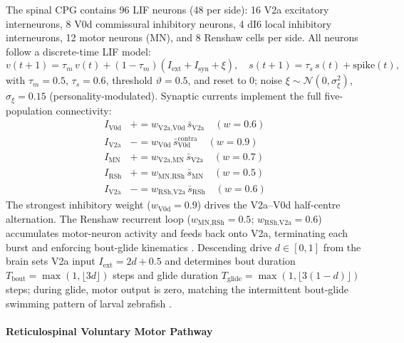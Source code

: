 \documentclass[12pt]{article}
\begin{document}
The spinal CPG contains 96 LIF neurons (48 per side):
16 V2a excitatory interneurons, 8 V0d commissural inhibitory neurons,
4 dI6 local inhibitory interneurons, 12 motor neurons (MN), and
8 Renshaw cells per side.
All neurons follow a discrete-time LIF model:
\begin{equation}\label{eq:cpg}
  v(t{+}1) = \tau_m\,v(t) + (1-\tau_m)(I_\text{ext} + I_\text{syn} + \xi),
  \quad s(t{+}1) = \tau_s\,s(t) + \text{spike}(t),
\end{equation}
with $\tau_m = 0.5$, $\tau_s = 0.6$, threshold $\vartheta = 0.5$,
and reset to 0; noise $\xi \sim \mathcal{N}(0, \sigma_\xi^2)$,
$\sigma_\xi = 0.15$ (personality-modulated).
Synaptic currents implement the full five-population connectivity:
\begin{align}\label{eq:cpg_syn}
  I_\text{V0d}  &+= w_\text{V2a,V0d}\,\bar s_\text{V2a}
    \quad (w = 0.6)\nonumber\\
  I_\text{V2a}  &-= w_\text{V0d}\,\bar s_\text{V0d}^\text{contra}
    \quad (w = 0.9) \nonumber\\
  I_\text{MN}   &+= w_\text{V2a,MN}\,\bar s_\text{V2a}
    \quad (w = 0.7)\nonumber\\
  I_\text{RSh}  &+= w_\text{MN,RSh}\,\bar s_\text{MN}
    \quad (w = 0.5)\nonumber\\
  I_\text{V2a}  &-= w_\text{RSh,V2a}\,\bar s_\text{RSh}
    \quad (w = 0.6)
\end{align}
The strongest inhibitory weight ($w_\text{V0d} = 0.9$) drives the
V2a--V0d half-centre alternation.
The Renshaw recurrent loop ($w_\text{MN,RSh} = 0.5$;
$w_\text{RSh,V2a} = 0.6$) accumulates motor-neuron activity and
feeds back onto V2a, terminating each burst and enforcing
bout-glide kinematics \citep{ampatzis2014}.
Descending drive $d \in [0,1]$ from the brain sets V2a input
$I_\text{ext} = 2d + 0.5$ and determines bout duration
$T_\text{bout} = \max(1,\lfloor 3d \rfloor)$ steps and
glide duration $T_\text{glide} = \max(1,\lfloor 3(1-d) \rfloor)$ steps;
during glide, motor output is zero, matching the intermittent
bout-glide swimming pattern of larval zebrafish
\citep{bhatt2007,marques2018}.

\paragraph{Reticulospinal Voluntary Motor Pathway}
\end{document}
